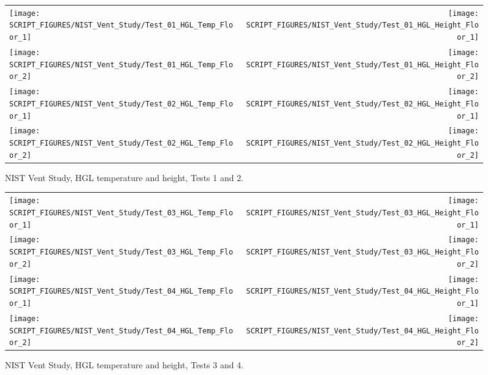 \begin{figure}[p]
\begin{tabular*}{\textwidth}{l@{\extracolsep{\fill}}r}
\texttt{[image: SCRIPT\_FIGURES/NIST\_Vent\_Study/Test\_01\_HGL\_Temp\_Floor\_1]} &
\texttt{[image: SCRIPT\_FIGURES/NIST\_Vent\_Study/Test\_01\_HGL\_Height\_Floor\_1]} \\
\texttt{[image: SCRIPT\_FIGURES/NIST\_Vent\_Study/Test\_01\_HGL\_Temp\_Floor\_2]} &
\texttt{[image: SCRIPT\_FIGURES/NIST\_Vent\_Study/Test\_01\_HGL\_Height\_Floor\_2]} \\
\texttt{[image: SCRIPT\_FIGURES/NIST\_Vent\_Study/Test\_02\_HGL\_Temp\_Floor\_1]} &
\texttt{[image: SCRIPT\_FIGURES/NIST\_Vent\_Study/Test\_02\_HGL\_Height\_Floor\_1]} \\
\texttt{[image: SCRIPT\_FIGURES/NIST\_Vent\_Study/Test\_02\_HGL\_Temp\_Floor\_2]} &
\texttt{[image: SCRIPT\_FIGURES/NIST\_Vent\_Study/Test\_02\_HGL\_Height\_Floor\_2]}
\end{tabular*}
\caption[NIST Vent Study, HGL temperature and height, Tests 1 and 2]
{NIST Vent Study, HGL temperature and height, Tests 1 and 2.}
\label{NIST_Vent_Study_1_2}
\end{figure}

\begin{figure}[p]
\begin{tabular*}{\textwidth}{l@{\extracolsep{\fill}}r}
\texttt{[image: SCRIPT\_FIGURES/NIST\_Vent\_Study/Test\_03\_HGL\_Temp\_Floor\_1]} &
\texttt{[image: SCRIPT\_FIGURES/NIST\_Vent\_Study/Test\_03\_HGL\_Height\_Floor\_1]} \\
\texttt{[image: SCRIPT\_FIGURES/NIST\_Vent\_Study/Test\_03\_HGL\_Temp\_Floor\_2]} &
\texttt{[image: SCRIPT\_FIGURES/NIST\_Vent\_Study/Test\_03\_HGL\_Height\_Floor\_2]} \\
\texttt{[image: SCRIPT\_FIGURES/NIST\_Vent\_Study/Test\_04\_HGL\_Temp\_Floor\_1]} &
\texttt{[image: SCRIPT\_FIGURES/NIST\_Vent\_Study/Test\_04\_HGL\_Height\_Floor\_1]} \\
\texttt{[image: SCRIPT\_FIGURES/NIST\_Vent\_Study/Test\_04\_HGL\_Temp\_Floor\_2]} &
\texttt{[image: SCRIPT\_FIGURES/NIST\_Vent\_Study/Test\_04\_HGL\_Height\_Floor\_2]}
\end{tabular*}
\caption[NIST Vent Study, HGL temperature and height, Tests 3 and 4]
{NIST Vent Study, HGL temperature and height, Tests 3 and 4.}
\label{NIST_Vent_Study_3_4}
\end{figure}

